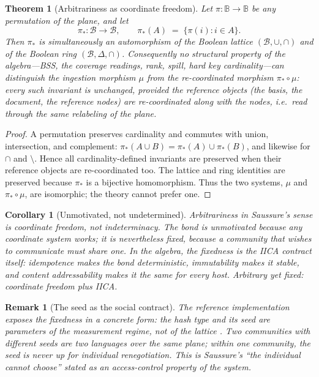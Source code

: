 \documentclass[11pt,a4paper]{article}
\newtheorem{theorem}[principle]{Theorem}
\newtheorem{corollary}[principle]{Corollary}
\newtheorem{remark}[principle]{Remark}
\theoremstyle{remark}
\newcommand{\Plane}{\ensuremath{\mathbb{B}}}            %
\newcommand{\Lat}{\ensuremath{\mathcal{B}}}              %
\newcommand{\xor}{\ensuremath{\Delta}}                   %
\newcommand{\Ing}{\ensuremath{\mu}}                      %
\begin{document}
\begin{theorem}[Arbitrariness as coordinate freedom]
\label{thm:coordinate-freedom}
Let $\pi : \Plane \to \Plane$ be any permutation of the plane, and let
\[
  \pi_* : \Lat \to \Lat, \qquad \pi_*(A) \;=\; \{\pi(i) : i \in A\}.
\]
Then $\pi_*$ is simultaneously an automorphism of the Boolean lattice
$(\Lat,\cup,\cap)$ and of the Boolean ring $(\Lat,\xor,\cap)$. Consequently no
structural property of the algebra---BSS, the coverage readings, rank, spill,
hard key cardinality---can distinguish the ingestion morphism $\Ing$ from the
re-coordinated morphism $\pi_* \circ \Ing$: every such invariant is
unchanged, provided the reference objects (the basis, the document, the
reference nodes) are re-coordinated along with the nodes, i.e.\ read through
the same relabeling of the plane.
\end{theorem}

\begin{proof}
A permutation preserves cardinality and commutes with union, intersection, and
complement: $\pi_*(A \cup B) = \pi_*(A) \cup \pi_*(B)$, and likewise for
$\cap$ and $\setminus$. Hence all cardinality-defined invariants are
preserved when their reference objects are re-coordinated too. The lattice
and ring identities are preserved because $\pi_*$ is a bijective
homomorphism. Thus the two systems, $\Ing$ and $\pi_* \circ \Ing$, are
isomorphic; the theory cannot prefer one.
\end{proof}

\begin{corollary}[Unmotivated, not undetermined]
\label{cor:fixedness}
Arbitrariness in Saussure's sense is \emph{coordinate freedom}, not
indeterminacy. The bond is unmotivated because any coordinate system works; it
is nevertheless \emph{fixed}, because a community that wishes to communicate
must share one. In the algebra, the fixedness is the IICA contract itself:
idempotence makes the bond deterministic, immutability makes it stable, and
content addressability makes it the same for every host. Arbitrary yet fixed:
coordinate freedom plus IICA.
\end{corollary}

\begin{remark}[The seed as the social contract]
The reference implementation exposes the fixedness in a concrete form: the
hash \emph{type} and its \emph{seed} are parameters of the measurement regime,
not of the lattice \cite{companion2026}. Two communities with different seeds
are two languages over the same plane; within one community, the seed is never
up for individual renegotiation. This is Saussure's ``the individual cannot
choose'' stated as an access-control property of the system.
\end{remark}
\end{document}
